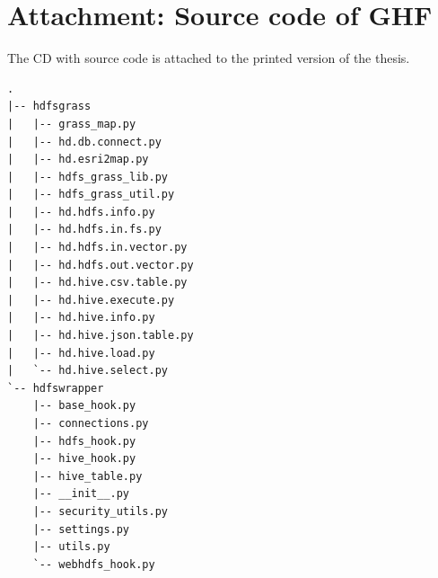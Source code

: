 \documentclass[a4paper,12pt,oneside]{report}
\begin{document}
	\section{Attachment: Source code of GHF}\label{att:install}
	The CD with source code is attached to the printed version of the thesis.
\begin{footnotesize}
\begin{lstlisting}[style=mybash]
.
|-- hdfsgrass
|   |-- grass_map.py
|   |-- hd.db.connect.py
|   |-- hd.esri2map.py
|   |-- hdfs_grass_lib.py
|   |-- hdfs_grass_util.py
|   |-- hd.hdfs.info.py
|   |-- hd.hdfs.in.fs.py
|   |-- hd.hdfs.in.vector.py
|   |-- hd.hdfs.out.vector.py
|   |-- hd.hive.csv.table.py
|   |-- hd.hive.execute.py
|   |-- hd.hive.info.py
|   |-- hd.hive.json.table.py
|   |-- hd.hive.load.py
|   `-- hd.hive.select.py
`-- hdfswrapper
    |-- base_hook.py
    |-- connections.py
    |-- hdfs_hook.py
    |-- hive_hook.py
    |-- hive_table.py
    |-- __init__.py
    |-- security_utils.py
    |-- settings.py
    |-- utils.py
    `-- webhdfs_hook.py

\end{lstlisting}
\end{footnotesize} 
\end{document}
